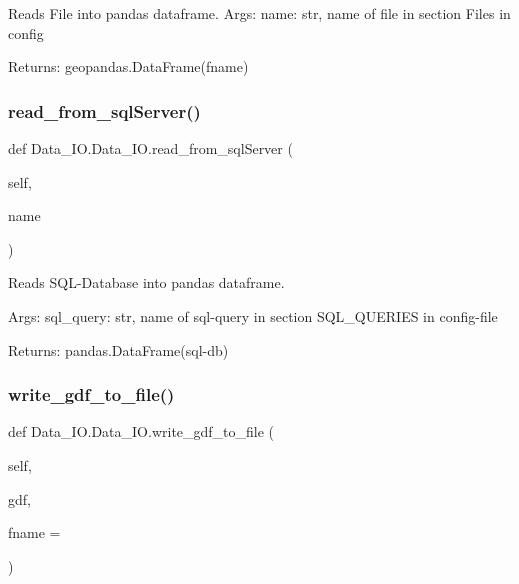 \begin{DoxyVerb}Reads File into pandas dataframe.
Args:
    name: str, name of file in section Files in config

Returns:
    geopandas.DataFrame(fname)
\end{DoxyVerb}
 \mbox{\label{class_data___i_o_1_1_data___i_o_ade762847985a15a6dbd01c444be1742e}} 
\subsubsection{\texorpdfstring{read\+\_\+from\+\_\+sql\+Server()}{read\_from\_sqlServer()}}
{\footnotesize\ttfamily def Data\+\_\+\+I\+O.\+Data\+\_\+\+I\+O.\+read\+\_\+from\+\_\+sql\+Server (\begin{DoxyParamCaption}\item[{}]{self,  }\item[{}]{name }\end{DoxyParamCaption})}

\begin{DoxyVerb}Reads SQL-Database into pandas dataframe.

Args:
    sql_query: str, name of sql-query in section SQL_QUERIES
        in config-file

Returns:
    pandas.DataFrame(sql-db)
\end{DoxyVerb}
 \mbox{\label{class_data___i_o_1_1_data___i_o_ab2e95c0af4a65cfabe861ecf4a41b76e}} 
\subsubsection{\texorpdfstring{write\+\_\+gdf\+\_\+to\+\_\+file()}{write\_gdf\_to\_file()}}
{\footnotesize\ttfamily def Data\+\_\+\+I\+O.\+Data\+\_\+\+I\+O.\+write\+\_\+gdf\+\_\+to\+\_\+file (\begin{DoxyParamCaption}\item[{}]{self,  }\item[{}]{gdf,  }\item[{}]{fname = {\ttfamily \textquotesingle{}\textquotesingle{}} }\end{DoxyParamCaption})}

